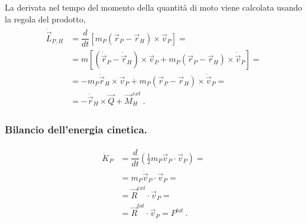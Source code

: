 \documentclass[letterpaper,10pt,italian]{jupyterBook}
\begin{document}
\sphinxAtStartPar
La derivata nel tempo del momento della quantità di moto viene calcolata usando la regola del prodotto,
\begin{equation*}
\begin{split}\begin{aligned}
\dot{\vec{L}}_{P,H} & = \dfrac{d}{dt} \left[ m_P (\vec{r}_P - \vec{r}_H) \times \vec{v}_P \right] = \\
& = m \left[ ( \dot{\vec{r}}_P - \dot{\vec{r}}_H ) \times \vec{v}_P + m_P (\vec{r}_P - \vec{r}_H) \times \dot{\vec{v}}_P \right] = \\
& = - m_P \dot{\vec{r}}_H \times \vec{v}_P + m_P (\vec{r}_P - \vec{r}_H) \times \dot{\vec{v}}_P = \\
& = - \dot{\vec{r}}_H \times \vec{Q} + \vec{M}_H^{ext} \ .
\end{aligned}\end{split}
\end{equation*}\subsubsection*{Bilancio dell’energia cinetica.}
\begin{equation*}
\begin{split}\begin{aligned}
\dot{K}_{P} & = \dfrac{d}{dt} \left( \frac{1}{2} m_P \vec{v}_P \cdot \vec{v}_P \right) = \\
            & = m_P \dot{\vec{v}}_P \cdot \vec{v}_P = \\
            & = \vec{R}^{ext} \cdot \vec{v}_P = \\
            & = \vec{R}^{tot} \cdot \vec{v}_P = P^{tot} \ .
\end{aligned}\end{split}
\end{equation*}
\sphinxstepscope
\end{document}
